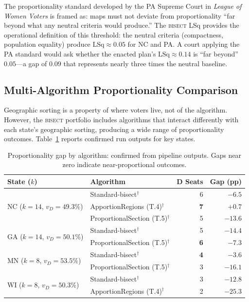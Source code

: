 The proportionality standard developed by the PA Supreme Court in \textit{League
of Women Voters} is framed as: maps must not deviate from proportionality ``far
beyond what any neutral criteria would produce.'' The \textsc{bisect} LSq provides
the operational definition of this threshold: the neutral criteria (compactness,
population equality) produce $\text{LSq} \approx 0.05$ for NC and PA. A court
applying the PA standard would ask whether the enacted plan's $\text{LSq} \approx 0.14$
is ``far beyond'' $0.05$---a gap of $0.09$ that represents nearly three times the
neutral baseline.

\subsection{Multi-Algorithm Proportionality Comparison}

Geographic sorting is a property of where voters live, not of the algorithm.
However, the \textsc{bisect} portfolio includes algorithms that interact differently with
each state's geographic sorting, producing a wide range of proportionality outcomes.
Table~\ref{tab:algo-prop-comparison} reports confirmed run outputs for key states.

\begin{table}[ht]
\centering
\caption{Proportionality gap by algorithm: confirmed from pipeline outputs.
Gaps near zero indicate near-proportional outcomes.}
\label{tab:algo-prop-comparison}
\begin{tabular}{@{}llrr@{}}
\toprule
State ($k$) & Algorithm & D Seats & Gap (pp) \\
\midrule
\multirow{3}{*}{NC ($k=14$, $v_D=49.3\%$)}
  & Standard-bisect$^\dagger$ & 6 & $-6.5$ \\
  & ApportionRegions (T.4)$^\dagger$ & \textbf{7} & $\mathbf{+0.7}$ \\
  & ProportionalSection (T.5)$^\dagger$ & 5 & $-13.6$ \\
\midrule
\multirow{2}{*}{GA ($k=14$, $v_D=50.1\%$)}
  & Standard-bisect$^\dagger$ & 5 & $-14.4$ \\
  & ProportionalSection (T.5)$^\dagger$ & \textbf{6} & $\mathbf{-7.3}$ \\
\midrule
\multirow{2}{*}{MN ($k=8$, $v_D=53.5\%$)}
  & Standard-bisect$^\dagger$ & \textbf{4} & $\mathbf{-3.6}$ \\
  & ProportionalSection (T.5)$^\dagger$ & 3 & $-16.1$ \\
\midrule
\multirow{2}{*}{WI ($k=8$, $v_D=50.3\%$)}
  & Standard-bisect$^\dagger$ & 3 & $-12.8$ \\
  & ApportionRegions (T.4)$^\dagger$ & 2 & $-25.3$ \\
\bottomrule
\end{tabular}
\end{table}

